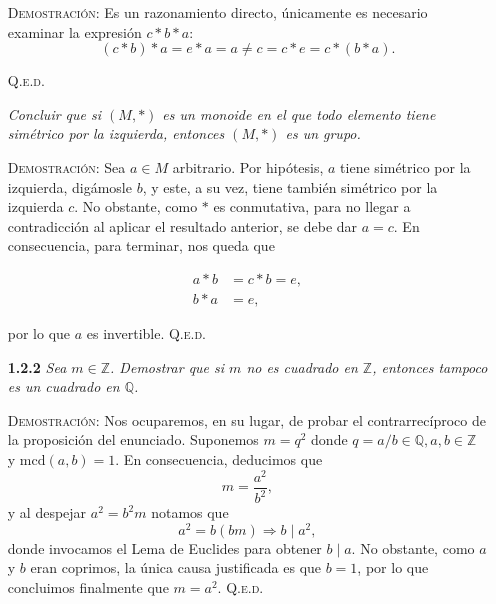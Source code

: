 \documentclass{article}
\newcommand{\mcd}{\text{mcd}}
\begin{document}
\begin{enumerate}
    \vspace{7px}

    \textsc{Demostración}: Es un razonamiento directo, únicamente es necesario examinar la expresión $c * b * a$: \[(c * b) * a = e * a = a \neq c = c * e = c * (b * a).\]

    \hfill{\textsc{Q.e.d.}}

    \vspace{7px}

    \newpage

    \textit{Concluir que si $(M, *)$ es un monoide en el que todo elemento tiene simétrico por la izquierda, entonces $(M, *)$ es un grupo.}

    \vspace{7px}

    \textsc{Demostración}: Sea $a \in M$ arbitrario. Por hipótesis, $a$ tiene simétrico por la izquierda, digámosle $b$, y este, a su vez, tiene también simétrico por la izquierda $c$. No obstante, como $*$ es conmutativa, para no llegar a contradicción al aplicar el resultado anterior, se debe dar $a = c$. En consecuencia, para terminar, nos queda que

    \begin{equation*}
    \begin{split}
        a * b & = c * b = e, \\
        b * a & = e,
    \end{split}
    \end{equation*}

    por lo que $a$ es invertible. \hfill{\textsc{Q.e.d.}}

    \vspace{12px}

    \item[\textbf{1.2.2}] \textit{Sea $m \in \mathbb{Z}$. Demostrar que si $m$ no es cuadrado en $\mathbb{Z}$, entonces tampoco es un cuadrado en $\mathbb{Q}$.}

    \vspace{7px}

    \textsc{Demostración}: Nos ocuparemos, en su lugar, de probar el contrarrecíproco de la proposición del enunciado. Suponemos $m = q^2$ donde $q = a / b \in \mathbb{Q}, a, b \in \mathbb{Z}$ y $\mcd(a, b) = 1$. En consecuencia, deducimos que \[m = \frac{a^2}{b^2},\] y al despejar $a^2 = b^2m$ notamos que \[a^2 = b(bm) \Longrightarrow b \mid a^2,\] donde invocamos el Lema de Euclides para obtener $b \mid a$. No obstante, como $a$ y $b$ eran coprimos, la única causa justificada es que $b = 1$, por lo que concluimos finalmente que $m = a^2$. \hfill{\textsc{Q.e.d.}}
\end{enumerate}
\end{document}

